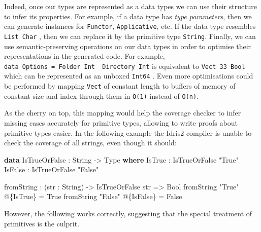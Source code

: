 \documentclass[
]{article}
\newenvironment{Shaded}{}{}
\newcommand{\DataTypeTok}[1]{\textcolor[rgb]{0.56,0.13,0.00}{#1}}
\newcommand{\KeywordTok}[1]{\textcolor[rgb]{0.00,0.44,0.13}{\textbf{#1}}}
\newcommand{\NormalTok}[1]{#1}
\newcommand{\OperatorTok}[1]{\textcolor[rgb]{0.40,0.40,0.40}{#1}}
\newcommand{\OtherTok}[1]{\textcolor[rgb]{0.00,0.44,0.13}{#1}}
\newcommand{\StringTok}[1]{\textcolor[rgb]{0.25,0.44,0.63}{#1}}
\begin{document}
Indeed, once our types are represented as a data types we can use their
structure to infer its properties. For example, if a data type has
\emph{type parameters}, then we can generate instances for
\texttt{Functor}, \texttt{Applicative}, etc. If the data type resembles
\texttt{List\ Char} , then we can replace it by the primitive type
\texttt{String}. Finally, we can use semantic-preserving operations on
our data types in order to optimise their representations in the
generated code. For example,
\texttt{data\ Options\ =\ Folder\ Int\ \textbar{}\ Directory\ Int} is
equivalent to \texttt{Vect\ 33\ Bool} which can be represented as an
unboxed \texttt{Int64} . Even more optimisations could be performed by
mapping \texttt{Vect} of constant length to buffers of memory of
constant size and index through them in \texttt{O(1)} instead of
\texttt{O(n)}.

As the cherry on top, this mapping would help the coverage checker to
infer missing cases accurately for primitive types, allowing to write
proofs about primitive types easier. In the following example the Idris2
compiler is unable to check the coverage of all strings, even though it
should:

\begin{Shaded}
\begin{Highlighting}[]
\KeywordTok{data} \DataTypeTok{IsTrueOrFalse} \OperatorTok{:} \DataTypeTok{String} \OtherTok{{-}\textgreater{}} \DataTypeTok{Type} \KeywordTok{where}
  \DataTypeTok{IsTrue} \OperatorTok{:} \DataTypeTok{IsTrueOrFalse} \StringTok{"True"}
  \DataTypeTok{IsFalse} \OperatorTok{:} \DataTypeTok{IsTrueOrFalse} \StringTok{"False"}

\NormalTok{fromString }\OperatorTok{:}\NormalTok{ (str }\OperatorTok{:} \DataTypeTok{String}\NormalTok{) }\OtherTok{{-}\textgreater{}} \DataTypeTok{IsTrueOrFalse}\NormalTok{ str }\OtherTok{=\textgreater{}} \DataTypeTok{Bool}
\NormalTok{fromString }\StringTok{"True"} \OperatorTok{@}\NormalTok{\{}\DataTypeTok{IsTrue}\NormalTok{\} }\OtherTok{=} \DataTypeTok{True}
\NormalTok{fromString }\StringTok{"False"} \OperatorTok{@}\NormalTok{\{}\DataTypeTok{IsFalse}\NormalTok{\} }\OtherTok{=} \DataTypeTok{False}
\end{Highlighting}
\end{Shaded}

However, the following works correctly, suggesting that the special
treatment of primitives is the culprit.
\end{document}
